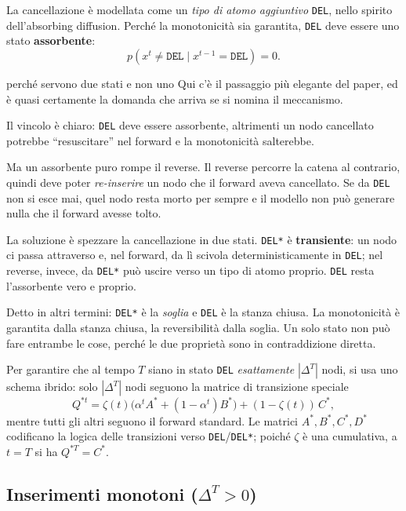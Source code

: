 La cancellazione è modellata come un \emph{tipo di atomo aggiuntivo} \texttt{DEL}, nello spirito dell'absorbing diffusion. Perché la monotonicità sia garantita, \texttt{DEL} deve essere uno stato \textbf{assorbente}:
\[
p(x^t \neq \texttt{DEL} \mid x^{t-1} = \texttt{DEL}) = 0.
\]

\begin{intuizione}{perché servono due stati e non uno}
Qui c'è il passaggio più elegante del paper, ed è quasi certamente la domanda che arriva se si nomina il meccanismo.

Il vincolo è chiaro: \texttt{DEL} deve essere assorbente, altrimenti un nodo cancellato potrebbe ``resuscitare'' nel forward e la monotonicità salterebbe.

Ma un assorbente puro rompe il reverse. Il reverse percorre la catena al contrario, quindi deve poter \emph{re-inserire} un nodo che il forward aveva cancellato. Se da \texttt{DEL} non si esce mai, quel nodo resta morto per sempre e il modello non può generare nulla che il forward avesse tolto.

La soluzione è spezzare la cancellazione in due stati. \texttt{DEL*} è \textbf{transiente}: un nodo ci passa attraverso e, nel forward, da lì scivola deterministicamente in \texttt{DEL}; nel reverse, invece, da \texttt{DEL*} può uscire verso un tipo di atomo proprio. \texttt{DEL} resta l'assorbente vero e proprio.

Detto in altri termini: \texttt{DEL*} è la \emph{soglia} e \texttt{DEL} è la stanza chiusa. La monotonicità è garantita dalla stanza chiusa, la reversibilità dalla soglia. Un solo stato non può fare entrambe le cose, perché le due proprietà sono in contraddizione diretta.
\end{intuizione}

Per garantire che al tempo $T$ siano in stato \texttt{DEL} \emph{esattamente} $|\Delta^T|$ nodi, si usa uno schema ibrido: solo $|\Delta^T|$ nodi seguono la matrice di transizione speciale
\[
Q^{*t} = \zeta(t)\big(\alpha^t A^* + (1-\alpha^t) B^*\big) + (1-\zeta(t))\, C^*,
\]
mentre tutti gli altri seguono il forward standard. Le matrici $A^*, B^*, C^*, D^*$ codificano la logica delle transizioni verso \texttt{DEL}/\texttt{DEL*}; poiché $\zeta$ è una cumulativa, a $t = T$ si ha $Q^{*T} = C^*$.

\subsection{Inserimenti monotoni ($\Delta^T > 0$)}

